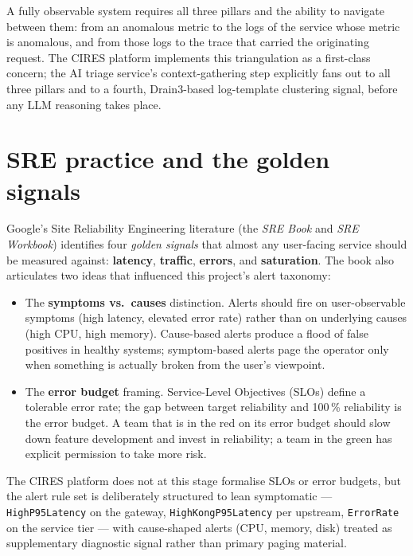 \documentclass[11pt,a4paper,oneside]{report}
\begin{document}
A fully observable system requires all three pillars and the ability
to navigate between them: from an anomalous metric to the logs of the
service whose metric is anomalous, and from those logs to the trace
that carried the originating request.  The CIRES platform implements
this triangulation as a first-class concern; the AI triage service's
context-gathering step explicitly fans out to all three pillars and
to a fourth, Drain3-based log-template clustering signal, before any
LLM reasoning takes place.

\section{SRE practice and the golden signals}

Google's Site Reliability Engineering literature (the
\emph{SRE Book} and \emph{SRE Workbook}) identifies four
\emph{golden signals} that almost any user-facing service should be
measured against: \textbf{latency}, \textbf{traffic},
\textbf{errors}, and \textbf{saturation}.  The book also articulates
two ideas that influenced this project's alert taxonomy:

\begin{itemize}
  \item The \textbf{symptoms vs.\ causes} distinction.  Alerts should
        fire on user-observable symptoms (high latency, elevated error
        rate) rather than on underlying causes (high CPU, high
        memory).  Cause-based alerts produce a flood of false positives
        in healthy systems; symptom-based alerts page the operator
        only when something is actually broken from the user's
        viewpoint.
  \item The \textbf{error budget} framing.  Service-Level Objectives
        (SLOs) define a tolerable error rate; the gap between target
        reliability and 100\,\% reliability is the error budget.  A
        team that is in the red on its error budget should slow down
        feature development and invest in reliability; a team in the
        green has explicit permission to take more risk.
\end{itemize}

The CIRES platform does not at this stage formalise SLOs or error
budgets, but the alert rule set is deliberately structured to lean
symptomatic --- \texttt{HighP95Latency} on the gateway,
\texttt{HighKongP95Latency} per upstream, \texttt{ErrorRate} on the
service tier --- with cause-shaped alerts (CPU, memory, disk)
treated as supplementary diagnostic signal rather than primary paging
material.
\end{document}
